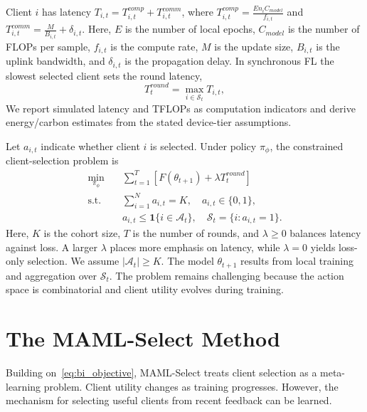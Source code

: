 \documentclass[journal]{IEEEtran}
\newcommand{\revision}[1]{#1}
\begin{document}
\revision{Client $i$ has latency $T_{i,t}=T_{i,t}^{comp}+T_{i,t}^{comm}$, where $T_{i,t}^{comp} = \frac{E n_i C_{model}}{f_{i,t}}$ and $T_{i,t}^{comm} = \frac{M}{B_{i,t}} + \delta_{i,t}$. Here, $E$ is the number of local epochs, $C_{model}$ is the number of FLOPs per sample, $f_{i,t}$ is the compute rate, $M$ is the update size, $B_{i,t}$ is the uplink bandwidth, and $\delta_{i,t}$ is the propagation delay. In synchronous FL the slowest selected client sets the round latency,}
\begin{equation}
	T_t^{round} = \max_{i \in \mathcal{S}_t} T_{i,t},
	\label{eq:round_latency}
\end{equation}
\revision{We report simulated latency and TFLOPs as computation indicators and derive energy/carbon estimates from the stated device-tier assumptions.}

\revision{Let $a_{i,t}$ indicate whether client $i$ is selected. Under policy $\pi_\phi$, the constrained client-selection problem is}
\begin{equation}
	\begin{aligned}
		\min_{\pi_\phi}\quad & \sum_{t=1}^{T} \left[F(\theta_{t+1}) + \lambda T_t^{round}\right] \\
		\text{s.t.}\quad & \sum_{i=1}^{N} a_{i,t}=K,\quad a_{i,t}\in\{0,1\}, \\
		& a_{i,t}\leq \mathbf{1}\{i\in\mathcal{A}_t\},\quad
		\mathcal{S}_t=\{i:a_{i,t}=1\}.
	\end{aligned}
	\label{eq:bi_objective}
\end{equation}
\revision{Here, $K$ is the cohort size, $T$ is the number of rounds, and $\lambda \geq 0$ balances latency against loss. A larger $\lambda$ places more emphasis on latency, while $\lambda=0$ yields loss-only selection. We assume $|\mathcal{A}_t|\geq K$. The model $\theta_{t+1}$ results from local training and aggregation over $\mathcal{S}_t$. The problem remains challenging because the action space is combinatorial and client utility evolves during training.}

\section{The MAML-Select Method}
\revision{Building on~\eqref{eq:bi_objective}, MAML-Select treats client selection as a meta-learning problem. Client utility changes as training progresses. However, the mechanism for selecting useful clients from recent feedback can be learned.}
\end{document}
